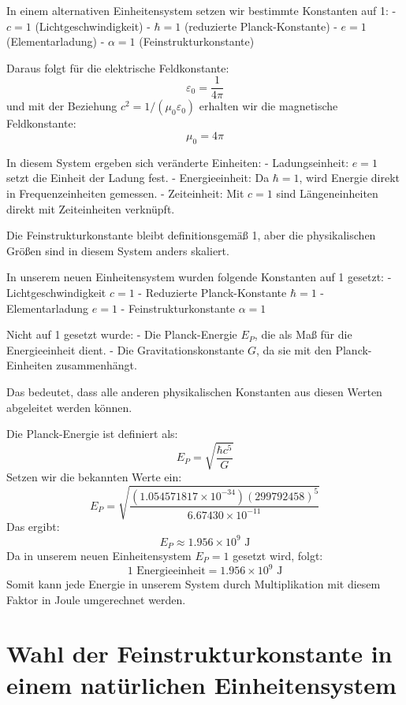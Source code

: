 \documentclass{article}
\begin{document}
	In einem alternativen Einheitensystem setzen wir bestimmte Konstanten auf 1:
	- \( c = 1 \) (Lichtgeschwindigkeit)
	- \( \hbar = 1 \) (reduzierte Planck-Konstante)
	- \( e = 1 \) (Elementarladung)
	- \( \alpha = 1 \) (Feinstrukturkonstante)
	
	Daraus folgt für die elektrische Feldkonstante:
	\[
	\varepsilon_0 = \frac{1}{4\pi}
	\]
	und mit der Beziehung \( c^2 = 1/(\mu_0 \varepsilon_0) \) erhalten wir die magnetische Feldkonstante:
	\[
	\mu_0 = 4\pi
	\]
	
	In diesem System ergeben sich veränderte Einheiten:
	- Ladungseinheit: \( e = 1 \) setzt die Einheit der Ladung fest.
	- Energieeinheit: Da \( \hbar = 1 \), wird Energie direkt in Frequenzeinheiten gemessen.
	- Zeiteinheit: Mit \( c = 1 \) sind Längeneinheiten direkt mit Zeiteinheiten verknüpft.
	
	Die Feinstrukturkonstante bleibt definitionsgemäß 1, aber die physikalischen Größen sind in diesem System anders skaliert.
	
	In unserem neuen Einheitensystem wurden folgende Konstanten auf 1 gesetzt:
	- Lichtgeschwindigkeit \( c = 1 \)
	- Reduzierte Planck-Konstante \( \hbar = 1 \)
	- Elementarladung \( e = 1 \)
	- Feinstrukturkonstante \( \alpha = 1 \)
	
	Nicht auf 1 gesetzt wurde:
	- Die Planck-Energie \( E_P \), die als Maß für die Energieeinheit dient.
	- Die Gravitationskonstante \( G \), da sie mit den Planck-Einheiten zusammenhängt.
	
	Das bedeutet, dass alle anderen physikalischen Konstanten aus diesen Werten abgeleitet werden können.
	
	Die Planck-Energie ist definiert als:
	\[
	E_P = \sqrt{\frac{\hbar c^5}{G}}
	\]
	Setzen wir die bekannten Werte ein:
	\[
	E_P = \sqrt{\frac{(1.054571817 \times 10^{-34}) (299792458)^5}{6.67430 \times 10^{-11}}}
	\]
	Das ergibt:
	\[
	E_P \approx 1.956 \times 10^9 \text{ J}
	\]
	Da in unserem neuen Einheitensystem \( E_P = 1 \) gesetzt wird, folgt:
	\[
	1 \text{ Energieeinheit} = 1.956 \times 10^9 \text{ J}
	\]
	Somit kann jede Energie in unserem System durch Multiplikation mit diesem Faktor in Joule umgerechnet werden.
	
	\section*{Wahl der Feinstrukturkonstante in einem natürlichen Einheitensystem}
	
\end{document}
